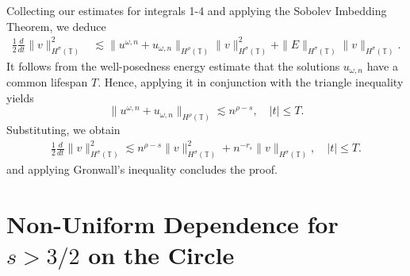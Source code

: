 \documentclass{beamer}
\newcommand{\ci}{\mathbb{T}}
\begin{document}
\begin{frame}
Collecting our estimates for integrals 1-4 and
applying the Sobolev Imbedding Theorem, we deduce
%
%
\begin{equation*}
\begin{split}
\frac{1}{2}\frac{d}{dt} \|v\|_{H^\sigma(\ci)}^2
& \lesssim
\|u^{\omega,n} + u_{\omega,n}\|_{H^{\rho}(\ci)} \|v\|_{H^\sigma(\ci)}^2
+ \|E\|_{H^\sigma(\ci)}
\|v\|_{H^\sigma(\ci)}.
\label{10}
\end{split}
\end{equation*}
%
%
\pause
It follows from the well-posedness energy estimate
that the solutions $u_{\omega,n}$ have a common 
lifespan $T$. Hence, applying it in conjunction with
the triangle inequality yields
%
%
\begin{equation*}
	\|u^{\omega,n} + u_{\omega,n}\|_{H^\rho(\ci)} \lesssim n^{\rho -s}, 
	\quad |t| \le T.
\label{3r}
\end{equation*}
%
%
%
%
%
%
Substituting, we obtain
%
%
\begin{equation*}
\begin{split}
\frac{1}{2}\frac{d}{dt}\|v\|_{H^\sigma(\ci)}^2 \lesssim n^{\rho - s}
\|v\|_{H^\sigma(\ci)}^2 + n^{-r_s}\|v\|_{H^\sigma(\ci)}, \quad |t| \le T.
\label{200r}
\end{split}
\end{equation*}
%
%
and applying Gronwall's inequality concludes the proof. \qquad \qedsymbol

\end{frame}

\section{Non-Uniform Dependence for $s > 3/2$ on the Circle}
\end{document}
